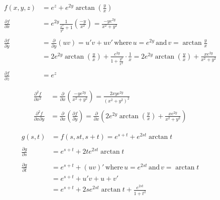 \documentclass[a4paper,norsk,12pt]{article}
\begin{document}
\begin{align*}
  f(x,y,z) &= e^z + e^{2y}\arctan{\left(\frac{y}{x}\right)} \\
  \\
  \frac{\partial f}{\partial x} &=
    e^{2y}\frac{1}{\frac{x^2}{y^2}+1} \left(\frac{-y}{x^2}\right)
      = \frac{-ye^{2y}}{x^2+y^2} \\
  \\
    \frac{\partial f}{\partial y} &= \frac{\partial}{\partial y}(uv) =
    u'v+uv' \,\text{where}\, u=e^{2y} \,\text{and}\, v=\arctan{\frac{y}{x}}
    \\
    &= 2e^{2y}\arctan{\left(\frac{y}{x}\right)} + \frac{e^{2y}}{1+\frac{y^2}{x^2}}\cdot\frac{1}{x}
    = 2e^{2y}\arctan{\left(\frac{y}{x}\right)} + \frac{xe^{2y}}{x^2+y^2} \\
    \\
    \frac{\partial f}{\partial z} &= e^z
\end{align*}

\begin{align*}
  \frac{\partial^2 f}{\partial x^2} &=
  \frac{\partial}{\partial x} \left(\frac{-ye^{2y}}{x^2+y^2}\right)
    = \frac{2xye^{2y}}{(x^2+y^2)^2}
  \\
  \\
  \frac{\partial^2 f}{\partial x \partial y} &=
  \frac{\partial}{\partial x} \left(\frac{\partial f}{\partial y}\right) =
    \frac{\partial}{\partial x} \left( 
      2e^{2y}\arctan{\left(\frac{y}{x}\right)} + \frac{xe^{2y}}{x^2+y^2}
    \right)
\end{align*}

\begin{align*}
  g(s,t) &= f(s, st, s+t) = e^{s+t} + e^{2st}\arctan{t} \\
  \\
  \frac{\partial g}{\partial s} &= e^{s+t} + 2te^{2st}\arctan{t} \\
  \\
  \frac{\partial g}{\partial t} &= e^{s+t} + (uv)' \,\text{where}\, u=e^{2st}
    \,\text{and}\, v=\arctan{t} \\
    &= e^{s+t} + u'v + u+v' \\
    &= e^{s+t} + 2se^{2st}\arctan{t} + \frac{e^{2st}}{1+t^2}
\end{align*}
\end{document}
